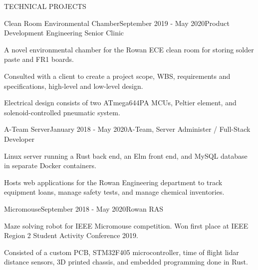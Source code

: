 \documentclass{article}
\begin{document}
\begin{rSection}{TECHNICAL PROJECTS}

  \begin{rSubsection}{Clean Room Environmental Chamber}{September 2019 - May
    2020}{Product Development Engineering Senior Clinic}{}
  \item A novel environmental chamber for the Rowan ECE clean room for storing
    solder paste and FR1 boards.
  \item Consulted with a client to create a project scope, WBS, requirements and
    specifications, high-level and low-level design.
  \item Electrical design consists of two ATmega644PA MCUs, Peltier element, and
    solenoid-controlled pneumatic system.
  \end{rSubsection}


  \begin{rSubsection}{A-Team Server}{January 2018 - May 2020}{A-Team, Server
    Administer / Full-Stack Developer}{}
  \item Linux server running a Rust back end, an
    Elm front end, and MySQL database in separate Docker containers.
  \item Hosts web applications for the Rowan Engineering department to track equipment
    loans, manage safety tests, and manage chemical inventories.
  \end{rSubsection}




  \begin{rSubsection}{Micromouse}{September 2018 - May 2020}{Rowan RAS}{}
  \item Maze solving robot for IEEE Micromouse competition. Won first place at
    IEEE Region 2 Student Activity Conference 2019.
  \item Consisted of a custom PCB, STM32F405 microcontroller, time of flight lidar
    distance sensors, 3D printed chassis, and embedded programming done in Rust.
  \end{rSubsection}


\end{rSection}
\end{document}
